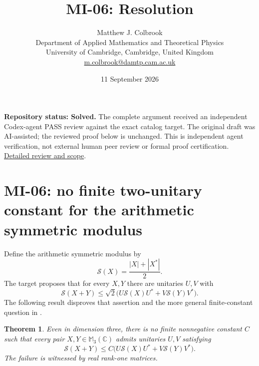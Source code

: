 \documentclass[10pt,a4paper]{article}
\title{MI-06: Resolution}
\author{Matthew J. Colbrook\\
\small Department of Applied Mathematics and Theoretical Physics\\
\small University of Cambridge, Cambridge, United Kingdom\\
\small\href{mailto:m.colbrook@damtp.cam.ac.uk}{m.colbrook@damtp.cam.ac.uk}}
\date{11 September 2026}
\newtheorem{theorem}{Theorem}[section]
\theoremstyle{remark}
\newcommand{\M}{\mathbb M}
\newcommand{\C}{\mathbb C}
\newcommand{\symmod}{\mathcal S}
\begin{document}
\maketitle
\textbf{Repository status: Solved.}
The complete argument received an independent Codex-agent PASS review
against the exact catalog target.
The original draft was AI-assisted; the reviewed proof below is unchanged.
This is independent agent verification, not external human peer review or
formal proof certification. \href{https://github.com/ajt60gaibb/OpenProblemsInNLA/blob/main/references/colbrook-matrix-2026-09-11/verification/reviews/MI-06-review.md}{Detailed review and scope}.
\par\medskip
\section{MI-06: no finite two-unitary constant for the arithmetic symmetric modulus}
\label{sec:mi06}

Define the arithmetic symmetric modulus by
\[
 \symmod(X)=\frac{|X|+|X^*|}{2}.
\]
The target proposes that for every $X,Y$ there are unitaries $U,V$ with
\[
 \symmod(X+Y)\leq\sqrt2\bigl(U\symmod(X)U^*+V\symmod(Y)V^*\bigr).
\]
The following result disproves that assertion and the more general finite-constant question in \cite[Conjecture 1.6 and equation (1.4)]{Zhang2026}.

\begin{theorem}\label{thm:mi06}
Even in dimension three, there is no finite nonnegative constant $C$ such that every pair $X,Y\in\M_3(\C)$ admits unitaries $U,V$ satisfying
\begin{equation}\label{eq:mi06-target}
 \symmod(X+Y)\leq C\bigl(U\symmod(X)U^*+V\symmod(Y)V^*\bigr).
\end{equation}
The failure is witnessed by real rank-one matrices.
\end{theorem}
\end{document}
